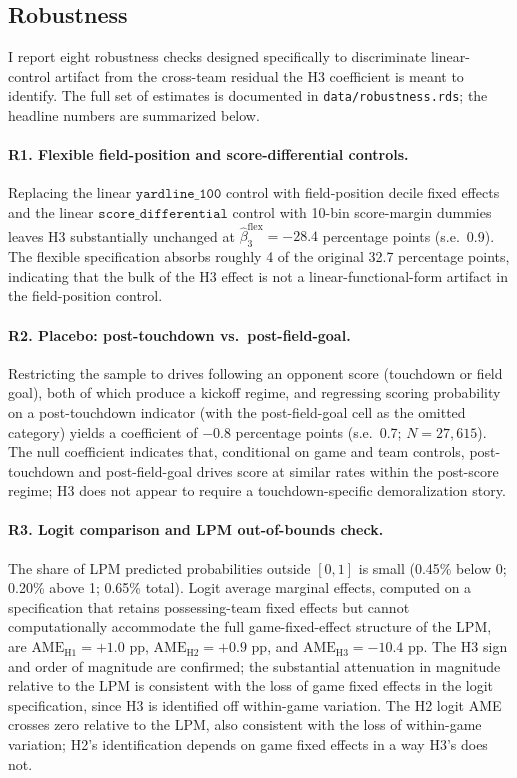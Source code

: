 \documentclass[11pt]{article}
\begin{document}
\subsection{Robustness}\label{sec:robust}

I report eight robustness checks designed specifically to discriminate
linear-control artifact from the cross-team residual the H3 coefficient is
meant to identify. The full set of estimates is documented in
\texttt{data/robustness.rds}; the headline numbers are summarized below.

\paragraph{R1. Flexible field-position and score-differential controls.}
Replacing the linear $\texttt{yardline\_100}$ control with field-position
decile fixed effects and the linear $\texttt{score\_differential}$ control
with 10-bin score-margin dummies leaves H3 substantially unchanged at
$\hat\beta_3^{\text{flex}} = -28.4$ percentage points (s.e.\ 0.9). The
flexible specification absorbs roughly 4 of the original 32.7 percentage
points, indicating that the bulk of the H3 effect is not a
linear-functional-form artifact in the field-position control.

\paragraph{R2. Placebo: post-touchdown vs.\ post-field-goal.} Restricting
the sample to drives following an opponent score (touchdown or field goal),
both of which produce a kickoff regime, and regressing scoring probability
on a post-touchdown indicator (with the post-field-goal cell as the omitted
category) yields a coefficient of $-0.8$ percentage points (s.e.\ 0.7;
$N = 27{,}615$). The null coefficient indicates that, conditional on game
and team controls, post-touchdown and post-field-goal drives score at
similar rates within the post-score regime; H3 does not appear to require
a touchdown-specific demoralization story.

\paragraph{R3. Logit comparison and LPM out-of-bounds check.} The share of
LPM predicted probabilities outside $[0,1]$ is small (0.45\% below 0;
0.20\% above 1; 0.65\% total). Logit average marginal effects, computed on
a specification that retains possessing-team fixed effects but cannot
computationally accommodate the full game-fixed-effect structure of the
LPM, are $\text{AME}_{\text{H1}} = +1.0$ pp, $\text{AME}_{\text{H2}} =
+0.9$ pp, and $\text{AME}_{\text{H3}} = -10.4$ pp. The H3 sign and order
of magnitude are confirmed; the substantial attenuation in magnitude
relative to the LPM is consistent with the loss of game fixed effects in
the logit specification, since H3 is identified off within-game variation.
The H2 logit AME crosses zero relative to the LPM, also consistent with
the loss of within-game variation; H2's identification depends on game
fixed effects in a way H3's does not.
\end{document}

